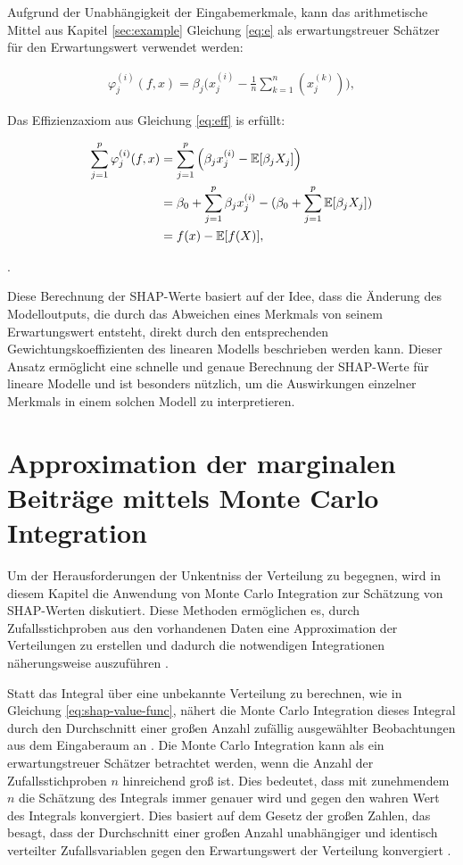 Aufgrund der Unabhängigkeit der Eingabemerkmale, kann das arithmetische Mittel aus Kapitel 
\ref{sec:example} Gleichung \ref{eq:e} als erwartungstreuer Schätzer für den Erwartungswert verwendet werden:

\begin{align}
    \varphi_j^{(i)}(f, x) = \beta_j \Big(x_j^{(i)} - \frac{1}{n} \sum_{k=1}^{n} (x_j^{(k)})\Big),
\end{align}

Das Effizienzaxiom aus Gleichung \ref{eq:eff} is erfüllt:

\begin{align}
    \sum_{j=1}^p \varphi_j^{(i)}(f, x) &= \sum_{j=1}^p  \Big( \beta_j x_j^{(i)} - \mathbb{E}[\beta_j X_j]\Big) \\ \notag
                                    &= \beta_0 + \sum_{j=1}^p \beta_j x_j^{(i)} - ( \beta_0 + \sum_{j=1}^p \mathbb{E}[\beta_j X_j]) \\ \notag
                                    &= f(x) - \mathbb{E}[f(X)],
\end{align}                 

\cite[S. 48]{Molnar_2023}.

Diese Berechnung der SHAP-Werte basiert auf der Idee, dass die Änderung 
des Modelloutputs, die durch das Abweichen eines Merkmals von seinem 
Erwartungswert entsteht, direkt durch den entsprechenden Gewichtungskoeffizienten 
des linearen Modells beschrieben werden kann. Dieser Ansatz ermöglicht eine 
schnelle und genaue Berechnung der SHAP-Werte für lineare Modelle und ist 
besonders nützlich, um die Auswirkungen einzelner Merkmals in einem solchen 
Modell zu interpretieren. 

\section{Approximation der marginalen Beiträge mittels Monte Carlo Integration}

Um der Herausforderungen der Unkentniss der Verteilung zu begegnen, wird in diesem Kapitel die Anwendung von Monte Carlo Integration 
zur Schätzung von SHAP-Werten diskutiert. Diese Methoden ermöglichen es, durch Zufallsstichproben aus den vorhandenen Daten 
eine Approximation der Verteilungen zu erstellen und dadurch die notwendigen Integrationen näherungsweise auszuführen \cite[S. 34]{Molnar_2023}. 

Statt das Integral über eine unbekannte Verteilung zu berechnen, wie in Gleichung \ref{eq:shap-value-func},
nähert die Monte Carlo Integration dieses Integral durch den Durchschnitt einer großen Anzahl zufällig 
ausgewählter Beobachtungen aus dem Eingaberaum an \cite[S. 34]{Molnar_2023}. Die Monte Carlo Integration kann als ein erwartungstreuer Schätzer 
betrachtet werden, wenn die Anzahl der Zufallsstichproben $n$ hinreichend groß ist. Dies bedeutet, dass mit zunehmendem $n$ die Schätzung des Integrals 
immer genauer wird und gegen den wahren Wert des Integrals konvergiert. Dies basiert auf dem Gesetz der großen Zahlen, 
das besagt, dass der Durchschnitt einer großen Anzahl unabhängiger und identisch verteilter Zufallsvariablen gegen den Erwartungswert der Verteilung konvergiert \cite[S. 83]{Robert_Casella_2004}. 

